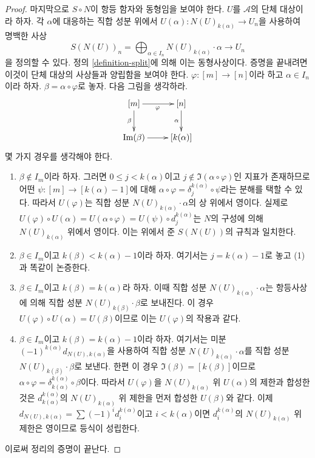 \begin{proof}
\medskip\noindent
마지막으로 $S \circ N$이 항등 함자와 동형임을 보여야 한다.
$U$를 $\mathcal{A}$의 단체 대상이라 하자. 각 $\alpha$에 대응하는 직합
성분 위에서 $U(\alpha) : N(U)_{k(\alpha)} \to U_n$을 사용하여 명백한 사상
$$
S(N(U))_n = \bigoplus\nolimits_{\alpha \in I_n} N(U)_{k(\alpha)} \cdot \alpha
\longrightarrow
U_n
$$
을 정의할 수 있다. 정의 \ref{definition-split}에 의해 이는 동형사상이다.
증명을 끝내려면 이것이 단체 대상의 사상들과 양립함을 보여야 한다.
$\varphi : [m] \to [n]$이라 하고 $\alpha \in I_n$이라 하자.
$\beta = \alpha \circ \varphi$로 놓자. 다음 그림을 생각하라.
$$
\xymatrix{
[m] \ar[r]_\varphi \ar[d]_\beta &
[n] \ar[d]_\alpha \\
\Im(\beta) \ar[r] &
[k(\alpha)]
}
$$
몇 가지 경우를 생각해야 한다.
\begin{enumerate}
\item $\beta \not \in I_m$이라 하자. 그러면
$0 \leq j < k(\alpha)$이고 $j \not \in \Im(\alpha \circ \varphi)$인 지표가
존재하므로 어떤 $\psi : [m] \to [k(\alpha) - 1]$에 대해
$\alpha \circ \varphi = \delta^{k(\alpha)}_j \circ \psi$라는 분해를
택할 수 있다. 따라서 $U(\varphi)$는 직합 성분
$N(U)_{k(\alpha)} \cdot \alpha$의 상 위에서 영이다. 실제로
$U(\varphi) \circ U(\alpha) =
U(\alpha \circ \varphi) = U(\psi) \circ d^{k(\alpha)}_j$는 $N$의 구성에
의해 $N(U)_{k(\alpha)}$ 위에서 영이다. 이는 위에서 준 $S(N(U))$의
규칙과 일치한다.
\item $\beta \in I_m$이고 $k(\beta) < k(\alpha) - 1$이라 하자.
여기서는 $j = k(\alpha) - 1$로 놓고 (1)과 똑같이 논증한다.
\item $\beta \in I_m$이고 $k(\beta) = k(\alpha)$라 하자.
이때 직합 성분 $N(U)_{k(\alpha)} \cdot \alpha$는 항등사상에 의해
직합 성분 $N(U)_{k(\beta)} \cdot \beta$로 보내진다. 이 경우
$U(\varphi) \circ U(\alpha) = U(\beta)$이므로 이는 $U(\varphi)$의
작용과 같다.
\item $\beta \in I_m$이고 $k(\beta) = k(\alpha) - 1$이라 하자.
여기서는 미분 $(-1)^{k(\alpha)} d_{N(U), k(\alpha)}$을 사용하여 직합 성분
$N(U)_{k(\alpha)} \cdot \alpha$를 직합 성분
$N(U)_{k(\beta)} \cdot \beta$로 보낸다. 한편 이 경우
$\Im(\beta) = [k(\beta)]$이므로
$\alpha \circ \varphi = \delta^{k(\alpha)}_{k(\alpha)} \circ \beta$이다.
따라서 $U(\varphi)$을 $N(U)_{k(\alpha)}$ 위 $U(\alpha)$의 제한과 합성한
것은 $d^{k(\alpha)}_{k(\alpha)}$의 $N(U)_{k(\alpha)}$ 위 제한을 먼저
합성한 $U(\beta)$와 같다. 이제
$d_{N(U), k(\alpha)} = \sum (-1)^i d^{k(\alpha)}_i$이고
$i < k(\alpha)$이면 $d^{k(\alpha)}_i$의 $N(U)_{k(\alpha)}$ 위 제한은
영이므로 등식이 성립한다.
\end{enumerate}
이로써 정리의 증명이 끝난다.
\end{proof}






